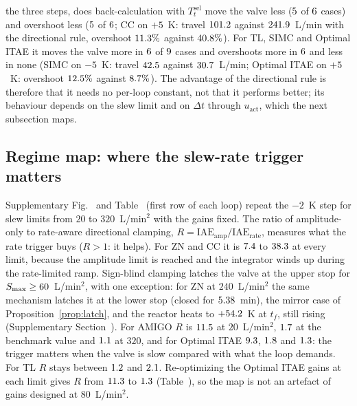 the three steps, does back-calculation with $T_t^{\mathrm{sel}}$ move the valve less ($5$ of $6$ cases) and overshoot less ($5$ of $6$; CC on $+5$~K: travel $101.2$ against $241.9$~L/min with the directional rule, overshoot $11.3\%$ against $40.8\%$). For TL, SIMC and Optimal ITAE it moves the valve more in $6$ of $9$ cases and overshoots more in $6$ and less in none (SIMC on $-5$~K: travel $42.5$ against $30.7$~L/min; Optimal ITAE on $+5$~K: overshoot $12.5\%$ against $8.7\%$). The advantage of the directional rule is therefore that it needs no per-loop constant, not that it performs better; its behaviour depends on the slew limit and on $\Delta t$ through $u_{\text{act}}$, which the next subsection maps.






\subsection{Regime map: where the slew-rate trigger matters}
\label{subsec:regime}
Supplementary Fig.~ and Table~ (first row of each loop) repeat the $-2$~K step for slew limits from $20$ to $320$~L/min$^2$ with the gains fixed. The ratio of amplitude-only to rate-aware directional clamping, $R = \mathrm{IAE}_{\mathrm{amp}}/\allowbreak\mathrm{IAE}_{\mathrm{rate}}$, measures what the rate trigger buys ($R > 1$: it helps). For ZN and CC it is $7.4$ to $38.3$ at every limit, because the amplitude limit is reached and the integrator winds up during the rate-limited ramp. Sign-blind clamping latches the valve at the upper stop for $S_{\max} \ge 60$~L/min$^2$, with one exception: for ZN at $240$~L/min$^2$ the same mechanism latches it at the lower stop (closed for $5.38$~min), the mirror case of Proposition~\ref{prop:latch}, and the reactor heats to $+54.2$~K at $t_f$, still rising (Supplementary Section~). For AMIGO $R$ is $11.5$ at $20$~L/min$^2$, $1.7$ at the benchmark value and $1.1$ at $320$, and for Optimal ITAE $9.3$, $1.8$ and $1.3$: the trigger matters when the valve is slow compared with what the loop demands. For TL $R$ stays between $1.2$ and $2.1$. Re-optimizing the Optimal ITAE gains at each limit gives $R$ from $11.3$ to $1.3$ (Table~), so the map is not an artefact of gains designed at $80$~L/min$^2$.

